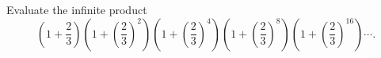Evaluate the infinite product
\[\left(1+\dfrac{2}{3}\right)\left(1+\left(\dfrac{2}{3}\right)^2\right)\left(1+\left(\dfrac{2}{3}\right)^4\right)\left(1+\left(\dfrac{2}{3}\right)^8\right)\left(1+\left(\dfrac{2}{3}\right)^{16}\right)\cdots.\]
